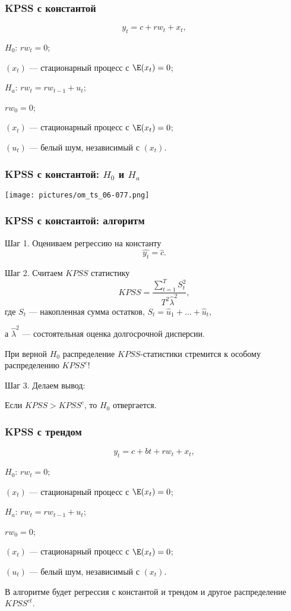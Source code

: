   
  \begin{frame}
    \frametitle{KPSS с константой}
    \[
      y_t = c + rw_t + x_t,
    \]
  
    \pause
  
    \alert{$H_0$: $rw_t = 0$};
    
    $(x_t)$ — стационарный процесс с $\E(x_t) = 0$;
    
    \pause
  
    \alert{$H_a$: $rw_t = rw_{t-1} + u_t$};

    $rw_0 = 0$;
  
    $(x_t)$ — стационарный процесс с $\E(x_t) = 0$;

    $(u_t)$ — белый шум, независимый с $(x_t)$.
  
  \end{frame}
  
  \begin{frame}
    \frametitle{KPSS с константой: $H_0$ и $H_a$}
    \texttt{[image: pictures/om\_ts\_06-077.png]}
  
  \end{frame}
  
  \begin{frame}
    \frametitle{KPSS с константой: алгоритм}
  
    Шаг 1. Оцениваем \alert{регрессию на константу} 
    \[
      \widehat{y_t} = \hat c.  
    \]
  
    \pause
    Шаг 2. Считаем $KPSS$ статистику
    \[
    KPSS = \frac{\sum_{t=1}^T S_t^2}{T^2 \hat \lambda^2},
    \]
    где $S_t$ — накопленная сумма остатков, $S_t = \hat u_1 + \ldots + \hat u_t$,

    а $\hat\lambda^2$ — состоятельная оценка долгосрочной дисперсии. 
  
    \pause
    При верной $H_0$ распределение $KPSS$-статистики стремится к \alert{особому распределению} $KPSS^c$!
  
    \pause 
    Шаг 3. Делаем вывод:
    
    Если $KPSS > KPSS^c$, то $H_0$ отвергается. 
  
  \end{frame}
  
  
  \begin{frame}
    \frametitle{KPSS с трендом}
    \[
      y_t = c + bt + rw_t + x_t,
    \]
  
    \pause
  
    \alert{$H_0$: $rw_t = 0$};
    
    $(x_t)$ — стационарный процесс с $\E(x_t) = 0$;
    
    \pause
  
    \alert{$H_a$: $rw_t = rw_{t-1} + u_t$};

    $rw_0 = 0$;
  
    $(x_t)$ — стационарный процесс с $\E(x_t) = 0$;

    $(u_t)$ — белый шум, независимый с $(x_t)$.
  
    \pause 
  
    В алгоритме будет регрессия \alert{с константой и трендом} и другое распределение $KPSS^{ct}$.
  
  \end{frame}
  
